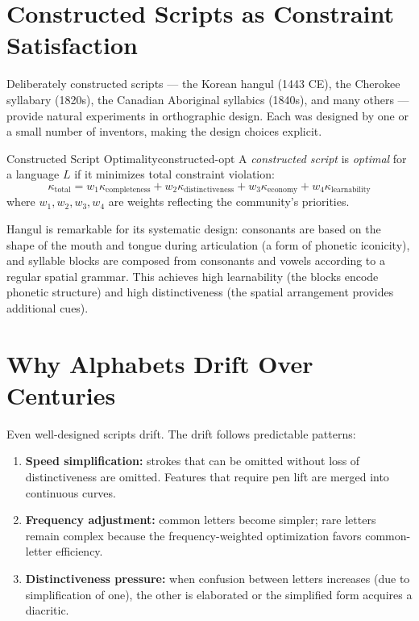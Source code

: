\section{Constructed Scripts as Constraint Satisfaction}

Deliberately constructed scripts — the Korean hangul (1443 CE),
the Cherokee syllabary (1820s), the Canadian Aboriginal syllabics
(1840s), and many others — provide natural experiments in orthographic
design. Each was designed by one or a small number of inventors,
making the design choices explicit.

\begin{definition}{Constructed Script Optimality}{constructed-opt}
  A \emph{constructed script} is \emph{optimal} for a language $L$ if
  it minimizes total constraint violation:
  \[
    \kappa_\text{total} = w_1 \kappa_\text{completeness}
    + w_2 \kappa_\text{distinctiveness}
    + w_3 \kappa_\text{economy}
    + w_4 \kappa_\text{learnability}
  \]
  where $w_1, w_2, w_3, w_4$ are weights reflecting the community's
  priorities.
\end{definition}

Hangul is remarkable for its systematic design: consonants are based
on the shape of the mouth and tongue during articulation (a form of
phonetic iconicity), and syllable blocks are composed from consonants
and vowels according to a regular spatial grammar. This achieves
high learnability (the blocks encode phonetic structure) and high
distinctiveness (the spatial arrangement provides additional cues).

\section{Why Alphabets Drift Over Centuries}

Even well-designed scripts drift. The drift follows predictable patterns:

\begin{enumerate}
  \item \textbf{Speed simplification:} strokes that can be omitted
        without loss of distinctiveness are omitted. Features that
        require pen lift are merged into continuous curves.
  \item \textbf{Frequency adjustment:} common letters become simpler;
        rare letters remain complex because the frequency-weighted
        optimization favors common-letter efficiency.
  \item \textbf{Distinctiveness pressure:} when confusion between letters
        increases (due to simplification of one), the other is
        elaborated or the simplified form acquires a diacritic.
\end{enumerate}

